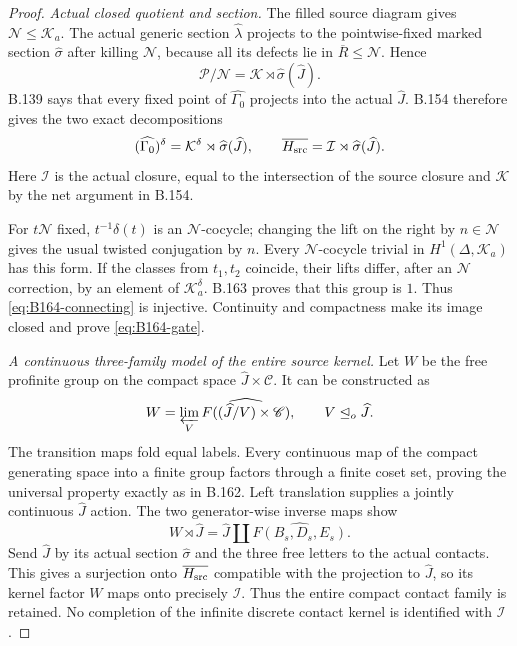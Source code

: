 \begin{proof}
\emph{Actual closed quotient and section.}
The filled source diagram gives $\mathcal N\le\mathcal K_a$.
The actual generic section $\widehat\lambda$ projects to the
pointwise-fixed marked section $\widehat\sigma$ after killing
$\mathcal N$, because all its defects lie in $\overline R\le\mathcal N$.
Hence
\[
 \mathcal P/\mathcal N=\mathcal K\rtimes\widehat\sigma(\widehat J).
\]
B.139 says that every fixed point of $\widehat{\Gamma_0}$ projects
into the actual $\widehat J$. B.154 therefore gives the two exact
decompositions
\[
 (\widehat{\Gamma_0})^\delta
       =\mathcal K^\delta\rtimes\widehat\sigma(\widehat J),\qquad
 \overline{H_{\rm src}}
       =\mathcal I\rtimes\widehat\sigma(\widehat J).
\]
Here $\mathcal I$ is the actual closure, equal to the intersection
of the source closure and $\mathcal K$ by the net argument in B.154.

For $t\mathcal N$ fixed, $t^{-1}\delta(t)$ is an $\mathcal N$-cocycle;
changing the lift on the right by $n\in\mathcal N$ gives the usual
twisted conjugation by $n$. Every $\mathcal N$-cocycle trivial in
$H^1(\Delta,\mathcal K_a)$ has this form. If the classes from $t_1,t_2$
coincide, their lifts differ, after an $\mathcal N$ correction, by an
element of $\mathcal K_a^\delta$. B.163 proves that this group is $1$.
Thus \eqref{eq:B164-connecting} is injective. Continuity and compactness
make its image closed and prove \eqref{eq:B164-gate}.

\emph{A continuous three-family model of the entire source kernel.}
Let $W$ be the free profinite group on the compact space
$\widehat J\times\mathscr C$. It can be constructed as
\[
 W=\varprojlim_V\widehat{F((\widehat J/V)\times\mathscr C)},
 \qquad V\trianglelefteq_o\widehat J.
\]
The transition maps fold equal labels. Every continuous map of the
compact generating space into a finite group factors through a finite
coset set, proving the universal property exactly as in B.162.
Left translation supplies a jointly continuous $\widehat J$ action.
The two generator-wise inverse maps show
\[
 W\rtimes\widehat J
     =\widehat J\amalg\widehat{F(B_s,D_s,E_s)}.
\]
Send $\widehat J$ by its actual section $\widehat\sigma$ and the
three free letters to the actual contacts. This gives a surjection
onto $\overline{H_{\rm src}}$ compatible with the projection to
$\widehat J$, so its kernel factor $W$ maps onto precisely $\mathcal I$.
Thus the entire compact contact family is retained. No completion of
the infinite discrete contact kernel is identified with $\mathcal I$.


\end{proof}
